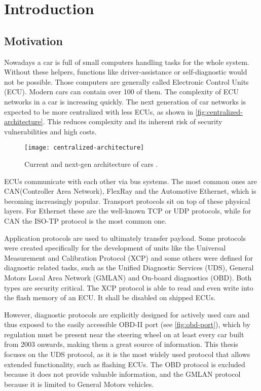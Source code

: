 \chapter{Introduction}
\label{sec:introduction}

\section{Motivation}
Nowadays a car is full of small computers handling tasks for the whole system. Without these helpers, functions like driver-assistance or self-diagnostic would not be possible. Those computers are generally called Electronic Control Units (ECU). Modern cars can contain over 100 of them. The complexity of ECU networks in a car is increasing quickly. The next generation of car networks is expected to be more centralized with less ECUs, as shown in \autoref{fig:centralized-architecture}. This reduces complexity and its inherent risk of security vulnerabilities and high costs.

\begin{figure}[htb]
    \centering
    \texttt{[image: centralized-architecture]}
    \caption{Current and next-gen architecture of cars \cite{car-architecture}.}
    \label{fig:centralized-architecture}
\end{figure}

ECUs communicate with each other via bus systems. The most common ones are CAN(Controller Area Network), FlexRay and the Automotive Ethernet, which is becoming increasingly popular. Transport protocols sit on top of these physical layers. For Ethernet these are the well-known TCP or UDP protocols, while for CAN the ISO-TP protocol is the most common one.

Application protocols are used to ultimately transfer payload. Some protocols were created specifically for the development of units like the Universal Measurement and Calibration Protocol (XCP) and some others were defined for diagnostic related tasks, such as the Unified Diagnostic Services (UDS), General Motors Local Area Network (GMLAN) and On-board diagnostics (OBD). Both types are security critical. The XCP protocol is able to read and even write into the flash memory of an ECU. It shall be disabled on shipped ECUs.

However, diagnostic protocols are explicitly designed for actively used cars and thus exposed to the easily accessible OBD-II port (see \autoref{fig:obd-port}), which by regulation must be present near the steering wheel on at least every car built from 2003 onwards, making them a great source of information. This thesis focuses on the UDS protocol, as it is the most widely used protocol that allows extended functionality, such as flashing ECUs. The OBD protocol is excluded because it does not provide valuable information, and the GMLAN protocol because it is limited to General Motors vehicles.

